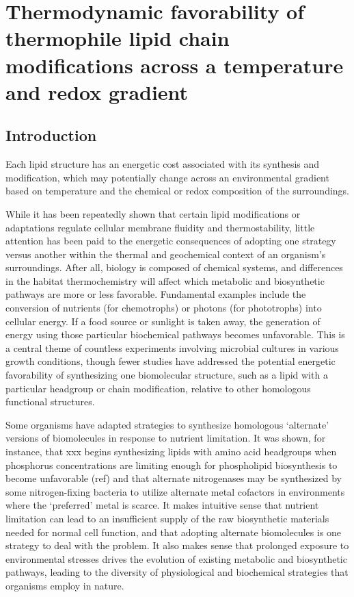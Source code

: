\chapter{Thermodynamic favorability of thermophile lipid chain modifications across a temperature and redox gradient}\label{ch2}

\section{Introduction}

Each lipid structure has an energetic cost associated with its synthesis and modification, which may potentially change across an environmental gradient based on temperature and the chemical or redox composition of the surroundings.

While it has been repeatedly shown that certain lipid modifications or adaptations regulate cellular membrane fluidity and thermostability, little attention has been paid to the energetic consequences of adopting one strategy versus another within the thermal and geochemical context of an organism's surroundings. After all, biology is composed of chemical systems, and differences in the habitat thermochemistry will affect which metabolic and biosynthetic pathways are more or less favorable.  Fundamental examples include the conversion of nutrients (for chemotrophs) or photons (for phototrophs) into cellular energy. If a food source or sunlight is taken away, the generation of energy using those particular biochemical pathways becomes unfavorable. This is a central theme of countless experiments involving microbial cultures in various growth conditions, though fewer studies have addressed the potential energetic favorability of synthesizing one biomolecular structure, such as a lipid with a particular headgroup or chain modification, relative to other homologous functional structures.

Some organisms have adapted strategies to synthesize homologous `alternate' versions of biomolecules in response to nutrient limitation. It was shown, for instance, that xxx begins synthesizing lipids with amino acid headgroups when phosphorus concentrations are limiting enough for phospholipid biosynthesis to become unfavorable (ref) and that alternate nitrogenases may be synthesized by some nitrogen-fixing bacteria to utilize alternate metal cofactors in environments where the `preferred' metal is scarce. It makes intuitive sense that nutrient limitation can lead to an insufficient supply of the raw biosynthetic materials needed for normal cell function, and that adopting alternate biomolecules is one strategy to deal with the problem. It also makes sense that prolonged exposure to environmental stresses drives the evolution of existing metabolic and biosynthetic pathways, leading to the diversity of physiological and biochemical strategies that organisms employ in nature.


